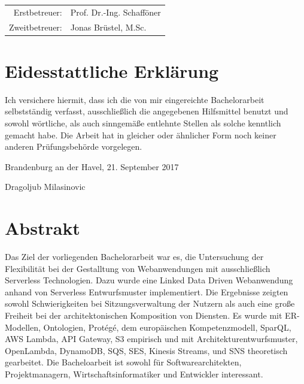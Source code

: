 \documentclass[
12pt,
english,
ngerman,
headsepline,
twoside,
openright,
numbers=noenddot,version=first
]{scrreprt}
\providecommand{\tabularnewline}{\\}
\let\myTOC\tableofcontents
\renewcommand\tableofcontents{
\begin{spacing}{1.1}
\myTOC
\end{spacing}
\clearpage
\pagenumbering{arabic}
}
\begin{document}
\vspace{1cm}

\noindent \begin{center}
\medskip{}
\begin{tabular}{rl}
Erstbetreuer: & Prof. Dr.-Ing. Schafföner\tabularnewline
Zweitbetreuer: & Jonas Brüstel, M.Sc.\tabularnewline
\end{tabular}
\par\end{center}

\noindent \begin{center}
{\huge }
\par\end{center}{\huge \par}

\newpage{}

%
\tableofcontents{}

\pagestyle{scrheadings}

\chapter*{Eidesstattliche Erklärung}

Ich versichere hiermit, dass ich die von mir eingereichte Bachelorarbeit selbstständig verfasst, ausschließlich die angegebenen Hilfsmittel benutzt und sowohl wörtliche, als auch sinngemäße entlehnte Stellen als solche kenntlich gemacht habe. Die Arbeit hat in gleicher oder ähnlicher Form noch keiner anderen Prüfungsbehörde vorgelegen.

Brandenburg an der Havel, 21. September 2017

\vspace{3cm}

Dragoljub Milasinovic

\chapter*{Abstrakt}

Das Ziel der vorliegenden Bachelorarbeit war es, die Untersuchung der Flexibilität bei der Gestalltung von Webanwendungen mit ausschließlich Serverless Technologien. Dazu wurde eine Linked Data Driven Webanwendung anhand von Serverless Entwurfsmuster implementiert. Die Ergebnisse zeigten sowohl Schwierigkeiten bei Sitzungsverwaltung der Nutzern als auch eine große Freiheit bei der architektonischen Komposition von Diensten. Es wurde mit ER-Modellen, Ontologien, Protégé, dem europäischen Kompetenzmodell, SparQL, AWS Lambda, API Gateway, S3 empirisch und mit Architekturentwurfsmuster, OpenLambda, DynamoDB, SQS, SES, Kinesis Streams, und SNS theoretisch gearbeitet. Die Bacheloarbeit ist sowohl für Softwarearchitekten, Projektmanagern, Wirtschaftsinformatiker und Entwickler interessant. 
\end{document}
